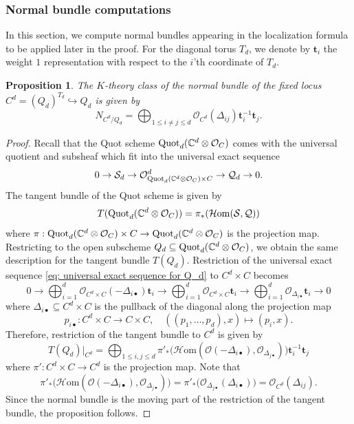 \documentclass[10pt]{amsart}
\newcommand{\BC}{\mathbb{C}}
\newcommand{\CO}{\mathcal{O}}
\newcommand{\bt}{\mathbf{t}}
\newcommand{\Quot}{\textnormal{Quot}}
\newcommand{\+}{{}^+}
\newtheorem {proposition}[theorem]{Proposition}
\theoremstyle{definition}
\theoremstyle {definition}
\theoremstyle {definition}
\begin{document}
\subsubsection{Normal bundle computations}
In this section, we compute normal bundles appearing in the localization formula to be applied later in the proof. For the diagonal torus $T_d$, we denote by $\bt_i$ the weight $1$ representation with respect to the $i$'th coordinate of $T_d$.

\begin{proposition} \label{prop: normalofqd}
    The $K$-theory class of the normal bundle of the fixed locus $C^d=(Q_d)^{T_d}\hookrightarrow Q_d$ is given by 
    $$N_{C^d/Q_d}=\bigoplus_{1\leq i\neq j\leq d}\CO_{C^d}(\Delta_{ij})\bt_i^{-1}\bt_j.
    $$

\end{proposition}

\begin{proof}
Recall that the Quot scheme $\Quot_{d}(\BC^d\otimes \CO_C)$ comes with the universal quotient and subsheaf which fit into the universal exact sequence 
\begin{equation}\label{eq: universal exact sequence for Q_d}
    0 \rightarrow \mathcal{S}_{d} \rightarrow \mathcal{O}^{d}_{\Quot_{d}(\BC^d\otimes \CO_C) \times C} \rightarrow \mathcal{Q}_{d} \rightarrow 0.
\end{equation}
The tangent bundle of the Quot scheme is given by 
\[ T(\Quot_{d}(\BC^d\otimes \CO_C)) =  \pi_{*}(\mathcal{H}\mathrm{om}(\mathcal{S},\mathcal{Q}))\]
where $\pi:\Quot_{d}(\BC^d\otimes \CO_C)\times C\rightarrow \Quot_{d}(\BC^d\otimes \CO_C)$ is the projection map. Restricting to the open subscheme $Q_d\subseteq \Quot_{d}(\BC^d\otimes \CO_C)$, we obtain the same description for the tangent bundle $T(Q_d)$. 
Restriction of the universal exact sequence \eqref{eq: universal exact sequence for Q_d} to $C^d\times C$ becomes 
$$0\rightarrow \bigoplus_{i=1}^d \CO_{C^d\times C}(-\Delta_{i\bullet})\bt_i\rightarrow \bigoplus_{i=1}^d \CO_{C^d\times C}\bt_i\rightarrow \bigoplus_{i=1}^d\CO_{\Delta_{i\bullet}}\bt_i\rightarrow 0
$$
where $\Delta_{i\bullet}\subseteq C^d\times C$ is the pullback of the diagonal along the projection map 
$$p_{i\bullet}:C^d\times C\rightarrow C\times C,\quad ((p_1,\dots, p_d),x)\mapsto (p_i,x). 
$$
Therefore, restriction of the tangent bundle to $C^d$ is given by 
$$T(Q_d)\big|_{C^d}=\bigoplus_{1\leq i,j\leq d}
\pi'_*\big(\mathcal{H}\mathrm{om}(\CO(-\Delta_{i\bullet}), \CO_{\Delta_{j\bullet}})\big)\bt_i^{-1}\bt_j
$$
where $\pi':C^d\times C\rightarrow C^d$ is the projection map. Note that 
$$\pi'_*\big(\mathcal{H}\mathrm{om}(\CO(-\Delta_{i\bullet}), \CO_{\Delta_{j\bullet}})\big)
=\pi'_*\big(\CO_{\Delta_{j\bullet}}(\Delta_{i\bullet})\big)=\CO_{C^d}(\Delta_{ij}). 
$$
Since the normal bundle is the moving part of the restriction of the tangent bundle, the proposition follows. 



\end{proof}
\end{document}
